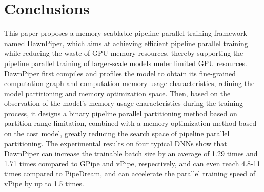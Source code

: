\section{Conclusions}
\label{sec:conclusion}
This paper proposes a memory scablable pipeline parallel training framework named DawnPiper,
which aims at achieving efficient pipeline parallel training while reducing the waste of GPU memory resources,
thereby supporting the pipeline parallel training of larger-scale models under limited GPU resources.
DawnPiper first compiles and profiles the model to obtain its fine-grained computation graph and computation memory usage characteristics,
refining the model partitioning and memory optimization space.
Then, based on the observation of the model's memory usage characteristics during the training process,
it designs a binary pipeline parallel partitioning method based on partition range limitation,
combined with a memory optimization method based on the cost model, greatly reducing the search space of pipeline parallel partitioning.
The experimental results on four typical DNNs show that DawnPiper can increase the trainable batch size by an average of
1.29 times and 1.71 times compared to GPipe and vPipe, respectively, and can even reach 4.8-11 times compared to PipeDream,
and can accelerate the parallel training speed of vPipe by up to 1.5 times.
